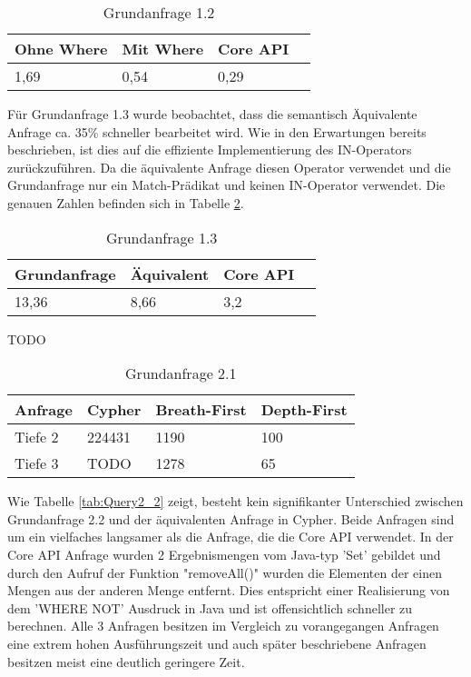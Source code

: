 \FloatBarrier
\begin{table}[h]
	\centering
		\begin{tabular}{ |p{3cm}|p{3cm}|p{3cm}|p{3cm}|  }
			\hline
			Ohne Where& Mit Where  &Core API\\
			\hline
			1,69   &  0,54  &0,29 \\
			\hline
		\end{tabular}
		\FloatBarrier
		\caption{Grundanfrage 1.2}
		\label{tab:Query1_2}
\end{table}
\FloatBarrier
Für Grundanfrage 1.3 wurde beobachtet, dass die semantisch Äquivalente Anfrage ca. 35\% schneller bearbeitet wird. Wie in den Erwartungen bereits beschrieben, ist dies auf die effiziente Implementierung des IN-Operators zurückzuführen. Da die äquivalente Anfrage diesen Operator verwendet und die Grundanfrage nur ein Match-Prädikat und keinen IN-Operator verwendet.
Die genauen Zahlen befinden sich in Tabelle	\ref{tab:Query1_3}.
\begin{table}[h]
	\centering
		\begin{tabular}{ |p{3cm}|p{3cm}|p{3cm}|p{3cm}|  }
			\hline
			Grundanfrage & Äquivalent&Core API\\
			\hline
			 13,36    & 8,66 &  3,2\\
			\hline
		\end{tabular}
		\caption{Grundanfrage 1.3}
		\label{tab:Query1_3}
\end{table}
\FloatBarrier
TODO
\FloatBarrier
\begin{table}[h]
\centering
		\begin{tabular}{ |p{3cm}||p{3cm}|p{3cm}|p{3cm}|  }
			\hline
			Anfrage& Cypher & Breath-First&Depth-First\\
			\hline
			Tiefe 2   & 224431    & 1190&  100\\
			Tiefe 3&    TODO  & 1278   & 65\\
			\hline
		\end{tabular}
		\caption{Grundanfrage 2.1}
\end{table}
\FloatBarrier
Wie Tabelle \ref{tab:Query2_2} zeigt, besteht kein  signifikanter Unterschied zwischen Grundanfrage 2.2 und der äquivalenten Anfrage in Cypher. Beide Anfragen sind um ein vielfaches langsamer als die Anfrage, die die Core API verwendet. In der Core API Anfrage wurden 2 Ergebnismengen vom Java-typ 'Set' gebildet und durch den Aufruf der Funktion "removeAll()" wurden die Elementen der einen Mengen aus der anderen Menge entfernt. Dies entspricht einer Realisierung von dem 'WHERE NOT' Ausdruck  in Java und ist offensichtlich schneller zu berechnen. Alle 3 Anfragen besitzen im Vergleich zu vorangegangen Anfragen eine extrem hohen Ausführungszeit und auch später beschriebene Anfragen besitzen meist eine deutlich geringere Zeit.
